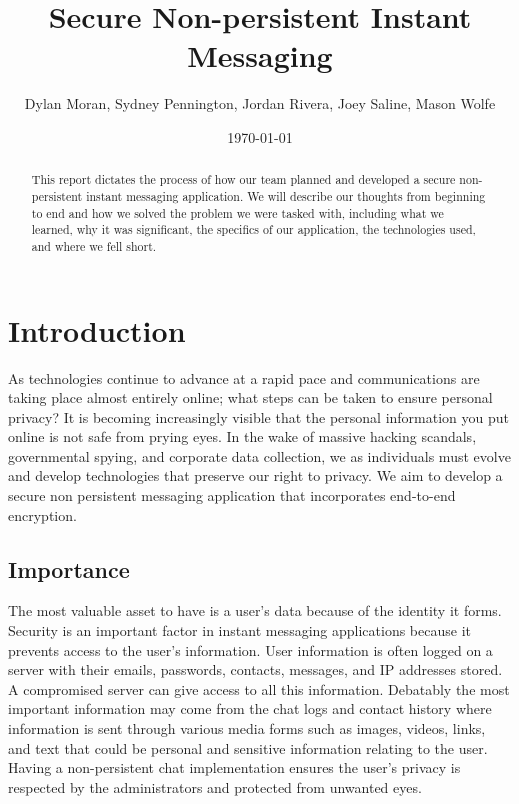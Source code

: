\documentclass[11pt]{article}
\date{
\today
}
\theoremstyle{plain}
\theoremstyle{definition}
\begin{document}
\title{Secure Non-persistent Instant Messaging}
\author{Dylan Moran, Sydney Pennington, Jordan Rivera, Joey Saline, Mason Wolfe}
\maketitle
	
\begin{abstract}
This report dictates the process of how our team planned and developed a secure non-persistent instant messaging application. We will describe our thoughts from beginning to end and how we solved the problem we were tasked with, including what we learned, why it was significant, the specifics of our application, the technologies used, and where we fell short.
		
\end{abstract}


\section{Introduction}\label{sec:intro}
As technologies continue to advance at a rapid pace and communications are taking place almost entirely online; what steps can be taken to ensure personal privacy? It is becoming increasingly visible that the personal information you put online is not safe from prying eyes. In the wake of massive hacking scandals, governmental spying, and corporate data collection, we as individuals must evolve and develop technologies that preserve our right to privacy. We aim to develop a secure non persistent messaging application that incorporates end-to-end encryption.

\subsection{Importance}\label{sec:importance}
The most valuable asset to have is a user’s data because of the identity it forms. Security is an important factor in instant messaging applications because it prevents access to the user’s information. User information is often logged on a server with their emails, passwords, contacts, messages, and IP addresses stored. A compromised server can give access to all this information. Debatably the most important information may come from the chat logs and contact history where information is sent through various media forms such as images, videos, links, and text that could be personal and sensitive information relating to the user. Having a non-persistent chat implementation ensures the user’s privacy is respected by the administrators and protected from unwanted eyes.
\end{document}
